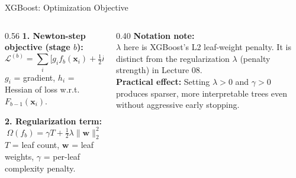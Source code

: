 \documentclass[aspectratio=169, 10pt]{beamer}
\begin{document}
\begin{frame}{XGBoost: Optimization Objective}

  \begin{columns}[T]
    \begin{column}{0.56\textwidth}
      \textbf{1. Newton-step objective (stage $b$):}
      \[
        \mathcal{L}^{(b)} = \sum_{i}
        \bigl[g_i f_b(\mathbf{x}_i)
        + \tfrac{1}{2} h_i f_b^2(\mathbf{x}_i)\bigr]
        + \Omega(f_b)
      \]
      $g_i$ = gradient, $h_i$ = Hessian of loss w.r.t.\ $F_{b-1}(\mathbf{x}_i)$.

      \smallskip
      \textbf{2. Regularization term:}
      \[
        \Omega(f_b) = \gamma T + \tfrac{1}{2}\lambda \|\mathbf{w}\|_2^2
      \]
      $T$ = leaf count, $\mathbf{w}$ = leaf weights,
      $\gamma$ = per-leaf complexity penalty.
    \end{column}
    \begin{column}{0.40\textwidth}
      \textbf{Notation note:}\\[4pt]
      $\lambda$ here is XGBoost's L2 leaf-weight penalty.
      It is distinct from the regularization $\lambda$ (penalty strength)
      in Lecture 08.\\[8pt]
      \textbf{Practical effect:} Setting $\lambda > 0$ and $\gamma > 0$
      produces sparser, more interpretable trees even without
      aggressive early stopping.
    \end{column}
  \end{columns}
\end{frame}
\end{document}
